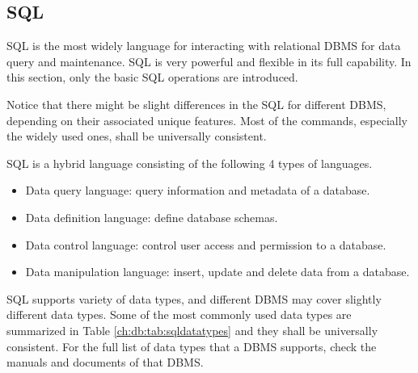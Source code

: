 \subsection{SQL}

SQL is the most widely language for interacting with relational DBMS for data query and maintenance. SQL is very powerful and flexible in its full capability. In this section, only the basic SQL operations are introduced.

Notice that there might be slight differences in the SQL for different DBMS, depending on their associated unique features. Most of the commands, especially the widely used ones, shall be universally consistent.

SQL is a hybrid language consisting of the following 4 types of languages.
\begin{itemize}
  \item Data query language: query information and metadata of a database.
  \item Data definition language: define database schemas.
  \item Data control language: control user access and permission to a database.
  \item Data manipulation language: insert, update and delete data from a database.
\end{itemize}

SQL supports variety of data types, and different DBMS may cover slightly different data types. Some of the most commonly used data types are summarized in Table \ref{ch:db:tab:sqldatatypes} and they shall be universally consistent. For the full list of data types that a DBMS supports, check the manuals and documents of that DBMS.

